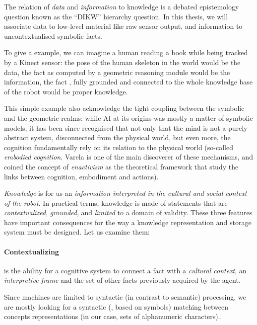 The relation of \emph{data} and \emph{information} to knowledge is a debated
epistemology question known as the ``DIKW'' hierarchy question. In this thesis,
we will associate data to low-level material like raw sensor output, and
information to uncontextualised symbolic facts.

To give a example, we can imagine a human reading a book while being tracked by
a Kinect sensor: the pose of the human skeleton in the world would be the data,
the fact  as computed by a geometric reasoning
module would be the information, the fact , fully grounded and connected to the whole knowledge base of
the robot would be proper knowledge.

This simple example also acknowledge the tight coupling between the symbolic
and the geometric realms: while AI at its origins was mostly a matter of
symbolic models, it has been since recognised that not only that the mind is
not a purely abstract system, disconnected from the physical world, but even
more, the cognition fundamentally rely on its relation to the physical world
(so-called \emph{embodied cognition}. Varela is one of the main discoverer
of these mechanisms, and coined the concept of \emph{enactivism} as the
theoretical framework that study the links between cognition, embodiment and
actions).

\emph{Knowledge} is for us an \emph{information interpreted in the cultural and
social context of the robot}. In practical terms, knowledge is made of
statements that are \emph{contextualized}, \emph{grounded}, and \emph{limited}
to a domain of validity. These three features have important consequences for
the way a knowledge representation and storage system must be designed. Let us
examine them:

\paragraph{Contextualizing} is the ability for a cognitive system to connect a
fact with a \emph{cultural context}, an \emph{interpretive frame} and the set
of other facts previously acquired by the agent.

Since machines are limited to syntactic (in contrast to semantic)
processing, we are mostly looking for a syntactic (\ie, based on symbols)
matching between concepts representations (in our case, sets of alphanumeric
characters)..

